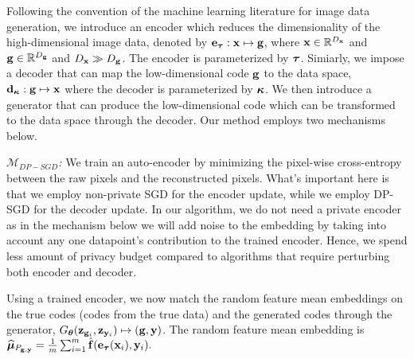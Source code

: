 \documentclass{article}
\begin{document}
Following the convention of the machine learning literature for image data generation, we introduce an encoder which reduces the dimensionality of the high-dimensional image data, denoted by $\mathbf{e}_{\mathbf{\bm{\tau}}}: \mathbf{x} \mapsto \mathbf{g}$, where $\mathbf{x} \in \mathbb{R}^{D_{\mathbf{x}}}$ and $\mathbf{g} \in \mathbb{R}^{D_{\mathbf{g}}}$ and $D_{\mathbf{x}} \gg D_{\mathbf{g}}$. The encoder is parameterized by $\mathbf{\bm{\tau}}$. Simiarly, we impose a decoder that can map the low-dimensional code $\mathbf{g}$ to the data space, $\mathbf{d}_{\mathbf{\bm{\kappa}}}: \mathbf{g} \mapsto \mathbf{x}$ where the decoder is parameterized by $\mathbf{\bm{\kappa}}$. 
%
We then introduce a generator that can produce the low-dimensional code which can be transformed to the data space through the decoder. Our method employs  {two mechanisms}
%
below.


%
\textit{$\mathcal{M}_{DP-SGD}$:}
We train an auto-encoder by minimizing the pixel-wise cross-entropy between the raw pixels and the reconstructed pixels. What's important here is that we employ non-private SGD
for the encoder update, while we employ DP-SGD for the decoder update. In our algorithm, we do not need a private encoder as in the mechanism below we will add noise to the embedding by taking into account any one datapoint's contribution to the trained encoder. Hence, we spend less amount of privacy budget compared to algorithms that require perturbing both encoder and decoder. 

Using a trained encoder, we now match the random feature mean embeddings on the true codes (codes from the true data) and the generated codes through the generator, $G_{\mathbf{\bm{\theta}}}(\mathbf{z}_{\mathbf{g}_i}, \mathbf{z}_{\mathbf{y}_i}) \mapsto (\mathbf{g}, \mathbf{y})$.
The random feature mean embedding is 
  $ \widehat{\mathbf{\bm{\mu}}}_{P_{\mathbf{g}, \mathbf{y}}}  =\tfrac{1}{m}\sum_{i=1}^{m} \hat{\mathbf{f}}(\mathbf{e}_{\mathbf{\bm{\tau}}}(\mathbf{x}_i), \mathbf{y}_i).$
%
%
\end{document}
